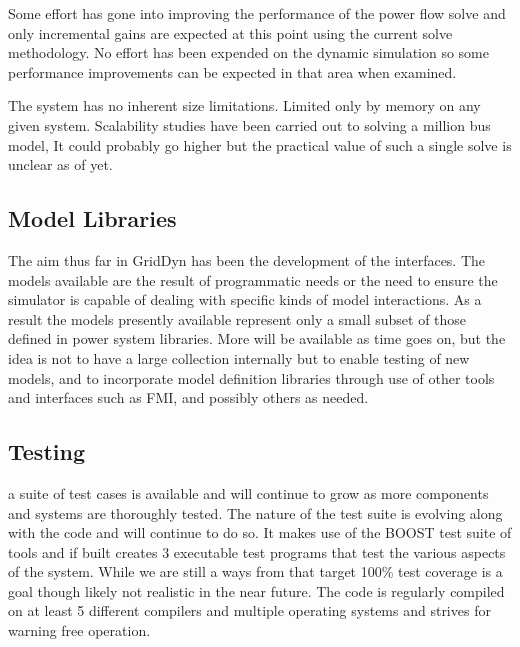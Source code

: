\documentclass[12pt]{article} %
\begin{document}
Some effort has gone into improving the performance of the power flow solve and only incremental gains are expected at this point using the current solve methodology.  No effort has been expended on the dynamic simulation so some performance improvements can be expected in that area when examined.  

The system has no inherent size limitations.  Limited only by memory on any given system.  Scalability studies have been carried out to solving a million bus model,  It could probably go higher but the practical value of such a single solve is unclear as of yet.  

\subsection{Model Libraries}  
The aim thus far in GridDyn has been the development of the interfaces.  The models available are the result of programmatic needs or the need to ensure the simulator is capable of dealing with specific kinds of model interactions.  As a result the models presently available represent only a small subset of those defined in power system libraries.  More will be available as time goes on, but the idea is not to have a large collection internally but to enable testing of new models, and to incorporate model definition libraries through use of other tools and interfaces such as FMI, and possibly others as needed.  

\subsection{Testing}
a suite of test cases is available and will continue to grow as more components and systems are thoroughly tested.  The nature of the test suite is evolving along with the code and will continue to do so.  It makes use of the BOOST test suite of tools and if built creates 3 executable test programs that test the various aspects of the system.  While we are still a ways from that target 100\% test coverage is a goal though likely not realistic in the near future.  The code is regularly compiled on at least 5 different compilers and multiple operating systems and strives for warning free operation. 
\end{document}
